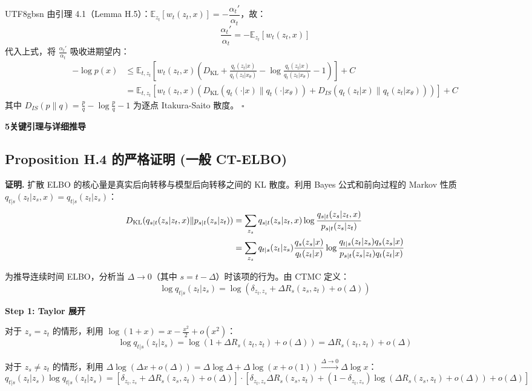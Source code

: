 \documentclass[11pt,a4paper]{article}
\newcommand{\Dkl}{D_{\mathrm{KL}}}
\begin{document}
\begin{CJK}{UTF8}{gbsn}
由引理 4.1（Lemma H.5）：$\mathbb{E}_{z_t}[w_t(z_t, x)] = -\dfrac{\alpha_t'}{\alpha_t}$，故：
\[
\frac{\alpha_t'}{\alpha_t} = -\mathbb{E}_{z_t}[w_t(z_t, x)]
\]
代入上式，将 $\frac{\alpha_t'}{\alpha_t}$ 吸收进期望内：
\begin{align*}
-\log p(x) &\leq \mathbb{E}_{t, z_t} \left[ w_t(z_t, x) \left( \Dkl + \frac{q_t(z_t|x)}{q_t(z_t|x_\theta)} - \log \frac{q_t(z_t|x)}{q_t(z_t|x_\theta)} - 1 \right) \right] + C \\
&= \mathbb{E}_{t, z_t} \left[ w_t(z_t, x) \left( \Dkl(q_t(\cdot|x) \| q_t(\cdot|x_\theta)) + D_{IS}(q_t(z_t|x) \| q_t(z_t|x_\theta)) \right) \right] + C
\end{align*}
其中 $D_{IS}(p\|q) = \frac{p}{q} - \log\frac{p}{q} - 1$ 为逐点 Itakura-Saito 散度。 \hfill $\square$


\begin{center}
{\LARGE\bfseries 5\quad 关键引理与详细推导}
\end{center}

\setcounter{section}{5}
\setcounter{subsection}{0}

\subsection{Proposition H.4 的严格证明 (一般 CT-ELBO)}

\textbf{证明.} 扩散 ELBO 的核心量是真实后向转移与模型后向转移之间的 KL 散度。利用 Bayes 公式和前向过程的 Markov 性质 $q_{t|s}(z_t|z_s, x) = q_{t|s}(z_t|z_s)$：
\begin{align}
\Dkl(q_{s|t}(z_s|z_t, x) \| p_{s|t}(z_s|z_t)) &= \sum_{z_s} q_{s|t}(z_s|z_t, x) \log \frac{q_{s|t}(z_s|z_t, x)}{p_{s|t}(z_s|z_t)} \notag \\
&= \sum_{z_s} q_{t|s}(z_t|z_s) \frac{q_s(z_s|x)}{q_t(z_t|x)} \log \frac{q_{t|s}(z_t|z_s) q_s(z_s|x)}{p_{s|t}(z_s|z_t) q_t(z_t|x)} \label{eq:kl-bayes}
\end{align}

为推导连续时间 ELBO，分析当 $\Delta \to 0$（其中 $s = t - \Delta$）时该项的行为。由 CTMC 定义：
\[
\log q_{t|s}(z_t|z_s) = \log(\delta_{z_t, z_s} + \Delta R_s(z_s, z_t) + o(\Delta))
\]

\textbf{Step 1: Taylor 展开}

对于 $z_s = z_t$ 的情形，利用 $\log(1+x) = x - \frac{x^2}{2} + o(x^2)$：
\[
\log q_{t|s}(z_t|z_s) = \log(1 + \Delta R_s(z_t, z_t) + o(\Delta)) = \Delta R_s(z_t, z_t) + o(\Delta)
\]

对于 $z_s \neq z_t$ 的情形，利用 $\Delta \log(\Delta x + o(\Delta)) = \Delta \log \Delta + \Delta \log(x + o(1)) \xrightarrow{\Delta \to 0} \Delta \log x$：
\[
q_{t|s}(z_t|z_s) \log q_{t|s}(z_t|z_s) = [\delta_{z_t,z_s} + \Delta R_s(z_s, z_t) + o(\Delta)] \cdot [\delta_{z_t,z_s} \Delta R_s(z_s,z_t) + (1-\delta_{z_t,z_s}) \log(\Delta R_s(z_s,z_t) + o(\Delta)) + o(\Delta)]
\]


\end{CJK}
\end{document}
